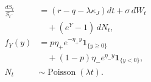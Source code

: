 \documentclass{equation-sheet}
\begin{document}
\begin{equation*}
\begin{aligned}
\frac{dS_t}{S_{t^-}}
  &= (r-q-\lambda\kappa_J)dt + \sigma\,dW_t \\
  &\quad + (e^Y-1)\,dN_t, \\
f_Y(y)
  &= p\eta_+e^{-\eta_+y}\mathbf 1_{\{y\geq0\}} \\
  &\quad +(1-p)\eta_-e^{\eta_-y}\mathbf 1_{\{y<0\}}, \\
N_t&\sim\operatorname{Poisson}(\lambda t).
\end{aligned}
\end{equation*}
\end{document}
